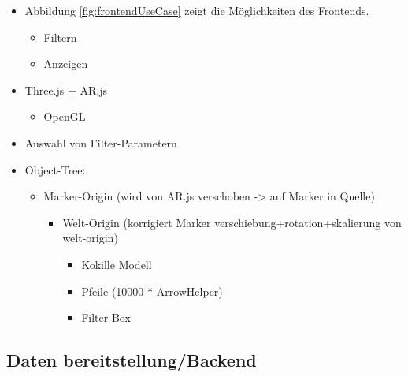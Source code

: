 \begin{itemize}
	\item Abbildung \ref{fig:frontendUseCase} zeigt
		die Möglichkeiten des Frontends.
	\begin{itemize}
		\item Filtern
		\item Anzeigen
	\end{itemize}
	
	\item Three.js + AR.js
	\begin{itemize}
		\item OpenGL
	\end{itemize}

	\item Auswahl von Filter-Parametern
	\item Object-Tree:
	\begin{itemize}
		\item Marker-Origin (wird von AR.js verschoben -> auf Marker in Quelle)
		\begin{itemize}
			\item Welt-Origin (korrigiert Marker verschiebung+rotation+skalierung von welt-origin)
			\begin{itemize}				
				\item Kokille Modell
				\item Pfeile (10000 * ArrowHelper)
				\item Filter-Box
			\end{itemize}
		\end{itemize}
	\end{itemize}
\end{itemize}



\subsection{Daten bereitstellung/Backend}

